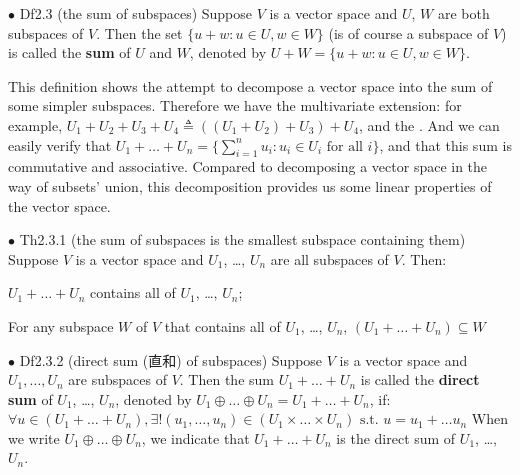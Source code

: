 \documentclass{article}
\begin{document}
\begin{Df}{$\bullet$ Df2.3 (the sum of subspaces)}
    Suppose $V$ is a vector space and $U$, $W$ are both subspaces of $V$. Then the set $\{u+w: u\in U, w\in W\}$ (is of course a subspace of $V$) is called the \textbf{sum} of $U$ and $W$, denoted by $U+W = \{u+w: u\in U, w\in W\}$.
\end{Df}

\begin{Rmk}{}
    This definition shows the attempt to decompose a vector space into the sum of some simpler subspaces. Therefore we have the multivariate extension: \textcolor{Df}{for example, $U_1+U_2+U_3+U_4 \triangleq ((U_1+U_2)+U_3)+U_4$, and the }. And we can easily verify that \textcolor{Th}{$U_1+\dots + U_n = \{\sum_{i=1}^{n} u_i: u_i\in U_i \text{ for all } i\}$, and that this sum is commutative and associative.} Compared to decomposing a vector space in the way of subsets' union, this decomposition provides us some linear properties of the vector space.
\end{Rmk}

\begin{Th}{$\bullet$ Th2.3.1 (the sum of subspaces is the smallest subspace containing them)}
    Suppose $V$ is a vector space and $U_1$, \dots, $U_n$ are all subspaces of $V$. Then:
    \begin{compactenum}
        \item $U_1+\dots + U_n$ contains all of $U_1$, \dots, $U_n$;
        \item For any subspace $W$ of $V$ that contains all of $U_1$, \dots, $U_n$, $(U_1+\dots + U_n)\subseteq W$
    \end{compactenum}
    \tcblower
\end{Th}

\begin{Df}{$\bullet$ Df2.3.2 (direct sum (直和) of subspaces)}
    Suppose $V$ is a vector space and $U_1, \dots, U_n$ are subspaces of $V$. Then the sum $U_1+\dots+U_n$ is called the \textbf{direct sum} of $U_1$, \dots, $U_n$, denoted by $U_1\oplus\dots\oplus U_n = U_1+\dots+U_n$, if:\\
        $\forall u\in (U_1+\dots+U_n), \exists! (u_1, \dots, u_n)\in (U_1\times\dots\times U_n) \text{  s.t.  } u = u_1+\dots u_n$
    When we write $U_1\oplus\dots\oplus U_n$, we indicate that $U_1+\dots+U_n$ is the direct sum of $U_1$, \dots, $U_n$.
\end{Df}
\end{document}
